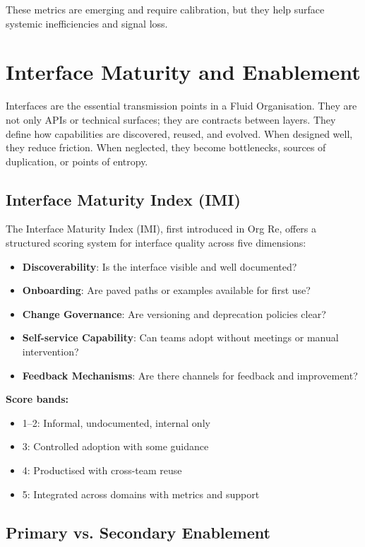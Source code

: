 \documentclass[12pt]{article}
\begin{document}
These metrics are emerging and require calibration, but they help surface systemic inefficiencies and signal loss.

\section{Interface Maturity and Enablement}

Interfaces are the essential transmission points in a Fluid Organisation. They are not only APIs or technical surfaces; they are contracts between layers. They define how capabilities are discovered, reused, and evolved. When designed well, they reduce friction. When neglected, they become bottlenecks, sources of duplication, or points of entropy.

\subsection*{Interface Maturity Index (IMI)}

The Interface Maturity Index (IMI), first introduced in Org Re, offers a structured scoring system for interface quality across five dimensions:
\begin{itemize}
    \item \textbf{Discoverability}: Is the interface visible and well documented?
    \item \textbf{Onboarding}: Are paved paths or examples available for first use?
    \item \textbf{Change Governance}: Are versioning and deprecation policies clear?
    \item \textbf{Self-service Capability}: Can teams adopt without meetings or manual intervention?
    \item \textbf{Feedback Mechanisms}: Are there channels for feedback and improvement?
\end{itemize}

\textbf{Score bands:}
\begin{itemize}
    \item 1--2: Informal, undocumented, internal only
    \item 3: Controlled adoption with some guidance
    \item 4: Productised with cross-team reuse
    \item 5: Integrated across domains with metrics and support
\end{itemize}

\subsection*{Primary vs. Secondary Enablement}
\end{document}
